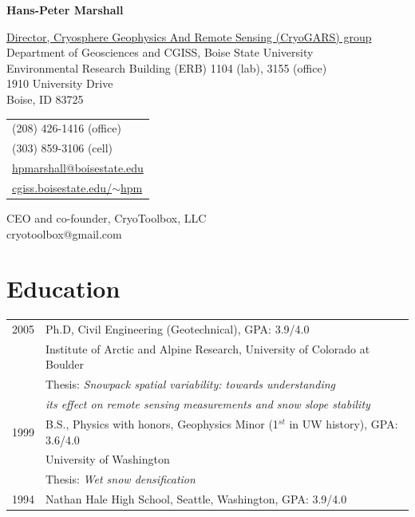 \documentclass[11pt]{article}
\def\name{Hans-Peter Marshall}
\begin{document}


\centerline{\Large \bf \name}

\vspace{0.25in}

\begin{minipage}{0.80\linewidth}
  \href{http://earth.boisestate.edu/cryogars/}{Director, Cryosphere Geophysics And Remote Sensing (CryoGARS) group} \\
  Department of Geosciences and CGISS, Boise State University \\
  Environmental Research Building (ERB) 1104 (lab), 3155 (office) \\
  1910 University Drive \\
  Boise, ID  83725
\end{minipage}
\begin{minipage}{0.30\linewidth}
  \begin{tabular}{l}
     (208) 426-1416 (office) \\
     (303) 859-3106 (cell) \\
    \href{mailto:hpmarshall@boisestate.edu}{hpmarshall@boisestate.edu} \\
    \href{http://cgiss.boisestate.edu/~hpm}{cgiss.boisestate.edu/$\sim$hpm} \\
  \end{tabular}
\end{minipage}

\vspace{0.5cm}

CEO and co-founder, CryoToolbox, LLC \\
cryotoolbox@gmail.com

\section*{Education}

\begin{tabular}{ll}
	2005 & Ph.D, Civil Engineering (Geotechnical), GPA: 3.9/4.0 \\
	          & Institute of Arctic and Alpine Research, University of Colorado at Boulder \\
		 & Thesis: \textit{Snowpack spatial variability: towards understanding} \\
                  &   \textit{its effect on remote sensing measurements and snow slope stability} \\
	1999 &  B.S., Physics with honors, Geophysics Minor (1$^{st}$ in UW history), GPA: 3.6/4.0 \\
	         &   University of Washington \\
	         &  Thesis: \textit{Wet snow densification} \\
       1994  &  Nathan Hale High School, Seattle, Washington, GPA: 3.9/4.0 \\
\end{tabular}
\end{document}
